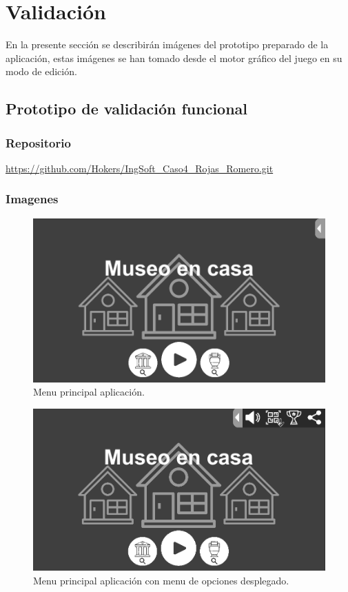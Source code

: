 \section{Validación}

En la presente sección se describirán imágenes del prototipo preparado de la aplicación, estas imágenes se han tomado desde el motor gráfico del juego en su modo de edición. 

\subsection{Prototipo de validación funcional}

\subsubsection{Repositorio}

\url{https://github.com/Hokers/IngSoft_Caso4_Rojas_Romero.git}

\subsubsection{Imagenes}

\begin{figure}[H]
\centerline{\includegraphics[width=15cm]{imgs/Game_2.PNG}}
\caption{Menu principal aplicación.}
\label{game_2}
\end{figure}

\begin{figure}[H]
\centerline{\includegraphics[width=15cm]{imgs/Game_1.PNG}}
\caption{Menu principal aplicación con menu de opciones desplegado.}
\label{game_1}
\end{figure}

